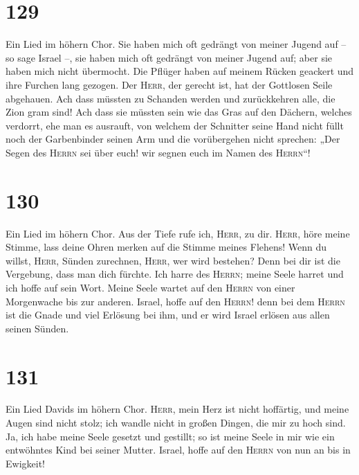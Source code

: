 \hypertarget{section-128}{%
\section{129}\label{section-128}}

 Ein Lied im höhern Chor. Sie haben mich oft gedrängt von
meiner Jugend auf -- so sage Israel --,  sie haben mich
oft gedrängt von meiner Jugend auf; aber sie haben mich nicht übermocht.
 Die Pflüger haben auf meinem Rücken geackert und ihre
Furchen lang gezogen.  Der \textsc{Herr}, der gerecht ist,
hat der Gottlosen Seile abgehauen.  Ach dass müssten zu
Schanden werden und zurückkehren alle, die Zion gram sind!
 Ach dass sie müssten sein wie das Gras auf den Dächern,
welches verdorrt, ehe man es ausrauft,  von welchem der
Schnitter seine Hand nicht füllt noch der Garbenbinder seinen Arm
 und die vorübergehen nicht sprechen: „Der Segen des
\textsc{Herrn} sei über euch! wir segnen euch im Namen des
\textsc{Herrn}``!

\hypertarget{section-129}{%
\section{130}\label{section-129}}

 Ein Lied im höhern Chor. Aus der Tiefe rufe ich,
\textsc{Herr}, zu dir.  \textsc{Herr}, höre meine Stimme,
lass deine Ohren merken auf die Stimme meines Flehens! 
Wenn du willst, \textsc{Herr}, Sünden zurechnen, \textsc{Herr}, wer wird
bestehen?  Denn bei dir ist die Vergebung, dass man dich
fürchte.  Ich harre des \textsc{Herrn}; meine Seele harret
und ich hoffe auf sein Wort.  Meine Seele wartet auf den
\textsc{Herrn} von einer Morgenwache bis zur anderen. 
Israel, hoffe auf den \textsc{Herrn}! denn bei dem \textsc{Herrn} ist
die Gnade und viel Erlösung bei ihm,  und er wird Israel
erlösen aus allen seinen Sünden.

\hypertarget{section-130}{%
\section{131}\label{section-130}}

 Ein Lied Davids im höhern Chor. \textsc{Herr}, mein Herz
ist nicht hoffärtig, und meine Augen sind nicht stolz; ich wandle nicht
in großen Dingen, die mir zu hoch sind.  Ja, ich habe
meine Seele gesetzt und gestillt; so ist meine Seele in mir wie ein
entwöhntes Kind bei seiner Mutter.  Israel, hoffe auf den
\textsc{Herrn} von nun an bis in Ewigkeit!

